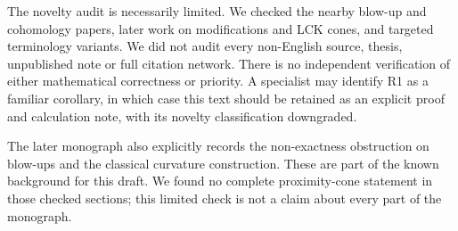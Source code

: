 \documentclass[12pt]{amsart}
\theoremstyle{definition}
\theoremstyle{remark}
\numberwithin{equation}{section}
\begin{document}
The novelty audit is necessarily limited. We checked the nearby blow-up and cohomology papers, later work on modifications and LCK cones, and targeted terminology variants. We did not audit every non-English source, thesis, unpublished note or full citation network. There is no independent verification of either mathematical correctness or priority. A specialist may identify R1 as a familiar corollary, in which case this text should be retained as an explicit proof and calculation note, with its novelty classification downgraded.

The later monograph \cite[Remark 18.29 and \S\S37.3--37.4]{OVBook} also explicitly records the non-exactness obstruction on blow-ups and the classical curvature construction. These are part of the known background for this draft. We found no complete proximity-cone statement in those checked sections; this limited check is not a claim about every part of the monograph.
\end{document}
